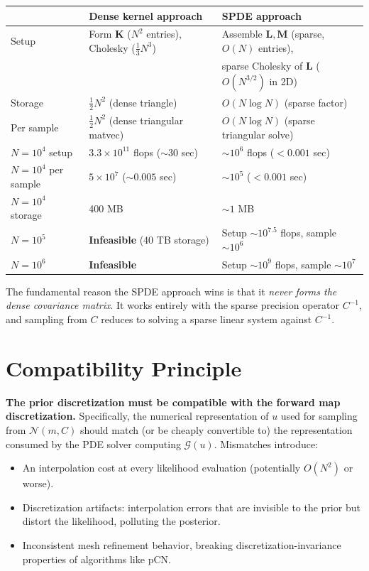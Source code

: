 \documentclass[11pt]{article}
\newcommand{\bK}{\mathbf{K}}
\newcommand{\bM}{\mathbf{M}}
\newcommand{\bL}{\mathbf{L}}
\begin{document}
\begin{center}
\renewcommand{\arraystretch}{1.3}
\begin{tabular}{@{}lll@{}}
\toprule
& \textbf{Dense kernel approach} & \textbf{SPDE approach} \\
\midrule
Setup & Form $\bK$ ($N^2$ entries), Cholesky ($\frac{1}{3}N^3$) & Assemble $\bL, \bM$ (sparse, $O(N)$ entries), \\
 & & sparse Cholesky of $\bL$ ($O(N^{3/2})$ in 2D) \\
Storage & $\frac{1}{2}N^2$ (dense triangle) & $O(N \log N)$ (sparse factor) \\
Per sample & $\frac{1}{2}N^2$ (dense triangular matvec) & $O(N \log N)$ (sparse triangular solve) \\
\midrule
$N = 10^4$ setup & $3.3 \times 10^{11}$ flops ($\sim 30$ sec) & $\sim 10^6$ flops ($< 0.001$ sec) \\
$N = 10^4$ per sample & $5 \times 10^7$ ($\sim 0.005$ sec) & $\sim 10^5$ ($< 0.001$ sec) \\
$N = 10^4$ storage & 400 MB & $\sim 1$ MB \\
\midrule
$N = 10^5$ & \textbf{Infeasible} (40 TB storage) & Setup $\sim 10^{7.5}$ flops, sample $\sim 10^6$ \\
$N = 10^6$ & \textbf{Infeasible} & Setup $\sim 10^{9}$ flops, sample $\sim 10^7$ \\
\bottomrule
\end{tabular}
\end{center}

The fundamental reason the SPDE approach wins is that it \emph{never forms the dense covariance matrix}.  It works entirely with the sparse precision operator $C^{-1}$, and sampling from $C$ reduces to solving a sparse linear system against $C^{-1}$.


\section{Compatibility Principle}\label{sec:compat}

\textbf{The prior discretization must be compatible with the forward map discretization.}  Specifically, the numerical representation of $u$ used for sampling from $\mathcal{N}(m,C)$ should match (or be cheaply convertible to) the representation consumed by the PDE solver computing $\mathcal{G}(u)$.  Mismatches introduce:
\begin{itemize}[nosep]
  \item An interpolation cost at every likelihood evaluation (potentially $O(N^2)$ or worse).
  \item Discretization artifacts: interpolation errors that are invisible to the prior but distort the likelihood, polluting the posterior.
  \item Inconsistent mesh refinement behavior, breaking discretization-invariance properties of algorithms like pCN.
\end{itemize}
\end{document}
